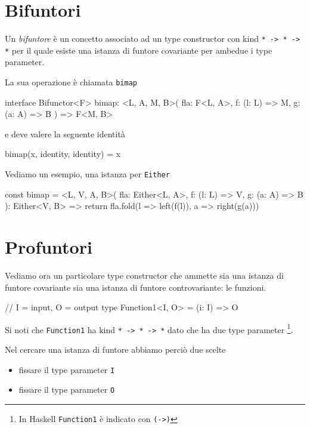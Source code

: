 \documentclass[12pt]{article}
\theoremstyle{definition}
\newenvironment{code}
  {\vspace{0.5cm} \VerbatimEnvironment\begin{typescriptcode}}
  {\end{typescriptcode} \vspace{0.2cm}}
\begin{document}
\newpage

\section{Bifuntori}

Un \emph{bifuntore} è un concetto associato ad un type constructor con kind \texttt{* -> * -> *}
per il quale esiste una istanza di funtore covariante per ambedue i type parameter.

La sua operazione è chiamata \texttt{bimap}

\begin{code}
interface Bifunctor<F> {
  bimap: <L, A, M, B>(
    fla: F<L, A>,
    f: (l: L) => M,
    g: (a: A) => B
  ) => F<M, B>
}
\end{code}

e deve valere la seguente identità

\begin{code}
bimap(x, identity, identity) = x
\end{code}

Vediamo un esempio, una istanza per \texttt{Either}

\begin{code}
const bimap = <L, V, A, B>(
  fla: Either<L, A>,
  f: (l: L) => V,
  g: (a: A) => B
): Either<V, B> => {
  return fla.fold(l => left(f(l)), a => right(g(a)))
}
\end{code}

\newpage

\section{Profuntori}

Vediamo ora un particolare type constructor che ammette sia una istanza di funtore covariante sia una istanza di
funtore controvariante: le funzioni.

\begin{code}
// I = input, O = output
type Function1<I, O> = (i: I) => O
\end{code}

Si noti che \texttt{Function1} ha kind \texttt{* -> * -> *} dato che
ha due type parameter \footnote{In Haskell \texttt{Function1} è indicato con \texttt{(->)}}.

Nel cercare una istanza di funtore abbiamo perciò due scelte

\begin{itemize}
\item fissare il type parameter \texttt{I}
\item fissare il type parameter \texttt{O}
\end{itemize}
\end{document}
